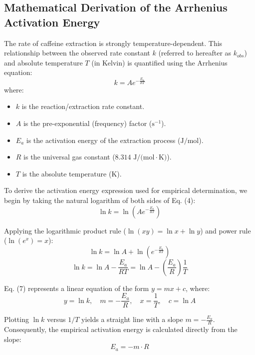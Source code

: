 \documentclass[11pt,a4paper]{article}
\begin{document}
\subsection{Mathematical Derivation of the Arrhenius Activation Energy}
The rate of caffeine extraction is strongly temperature-dependent. This relationship between the observed rate constant $k$ (referred to hereafter as $k_{obs}$) and absolute temperature $T$ (in Kelvin) is quantified using the Arrhenius equation:
\begin{equation}
k = A e^{-\frac{E_a}{R T}}
\end{equation}
where:
\begin{itemize}
    \item $k$ is the reaction/extraction rate constant.
    \item $A$ is the pre-exponential (frequency) factor ($\text{s}^{-1}$).
    \item $E_a$ is the activation energy of the extraction process ($\text{J/mol}$).
    \item $R$ is the universal gas constant ($8.314 \text{ J/(mol}\cdot\text{K)}$).
    \item $T$ is the absolute temperature ($\text{K}$).
\end{itemize}

To derive the activation energy expression used for empirical determination, we begin by taking the natural logarithm of both sides of Eq. (4):
\begin{equation}
\ln k = \ln\left(A e^{-\frac{E_a}{R T}}\right)
\end{equation}

Applying the logarithmic product rule ($\ln(xy) = \ln x + \ln y$) and power rule ($\ln(e^x) = x$):
\begin{equation}
\ln k = \ln A + \ln\left(e^{-\frac{E_a}{R T}}\right)
\end{equation}
\begin{equation}
\ln k = \ln A - \frac{E_a}{R T} = \ln A - \left(\frac{E_a}{R}\right) \frac{1}{T}
\end{equation}

Eq. (7) represents a linear equation of the form $y = mx + c$, where:
\begin{equation}
y = \ln k, \quad m = -\frac{E_a}{R}, \quad x = \frac{1}{T}, \quad c = \ln A
\end{equation}

Plotting $\ln k$ versus $1/T$ yields a straight line with a slope $m = -\frac{E_a}{R}$. Consequently, the empirical activation energy is calculated directly from the slope:
\begin{equation}
E_a = -m \cdot R
\end{equation}
\end{document}
